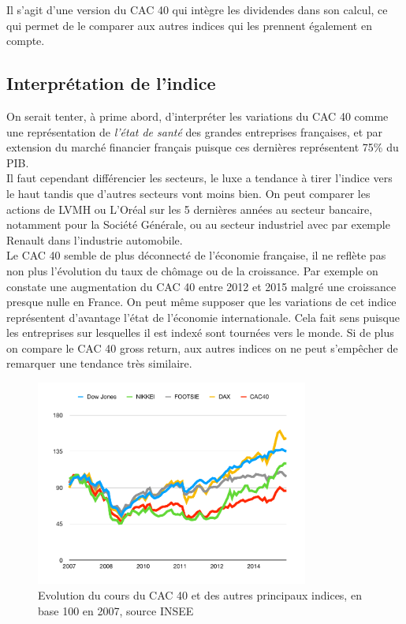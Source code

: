 \documentclass[main.tex]{subfiles}
\begin{document}
\begin{definition}
       Il s'agit d'une version du CAC 40 qui intègre les dividendes dans son calcul, ce qui permet de le comparer aux autres indices qui les prennent également en compte. 
\end{definition}

\subsection{Interprétation de l'indice}

On serait tenter, à prime abord, d'interpréter les variations du CAC 40 comme une représentation de \textit{l'état de santé} des grandes entreprises françaises, et par extension du marché financier français puisque ces dernières représentent 75\% du PIB. \\

Il faut cependant différencier les secteurs, le luxe a tendance à tirer l'indice vers le haut tandis que d'autres secteurs vont moins bien. On peut comparer les actions de LVMH ou L'Oréal sur les 5 dernières années au secteur bancaire, notamment pour la Société Générale, ou au secteur industriel avec par exemple Renault dans l'industrie automobile. \\ 

Le CAC 40 semble de plus déconnecté de l'économie française, il ne reflète pas non plus l'évolution du taux de chômage ou de la croissance. Par exemple on constate une augmentation du CAC 40 entre 2012 et 2015 malgré une croissance presque nulle en France. On peut même supposer que les variations de cet indice représentent d'avantage l'état de l'économie internationale. Cela fait sens puisque les entreprises sur lesquelles il est indexé sont tournées vers le monde. Si de plus on compare le CAC 40 gross return, aux autres indices on ne peut s'empêcher de remarquer une tendance très similaire. 

\begin{figure}[htpb]
        \centering
        \includegraphics[width=0.8\textwidth]{share_index.pdf}
        \caption{Evolution du cours du CAC 40 et des autres principaux indices, en base 100 en 2007, source INSEE}
        \label{fig:CAC}
\end{figure}
\end{document}
